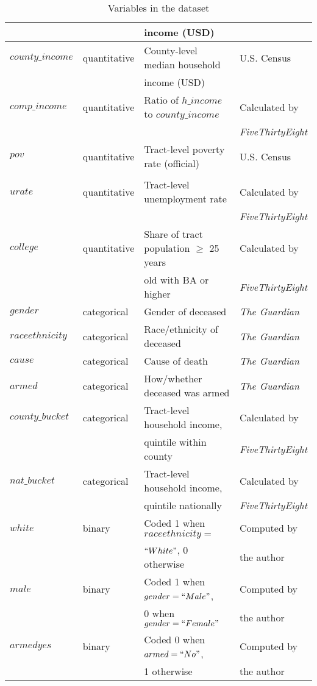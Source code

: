 \begin{table}[h]
\begin{tabular}{|l|l|l|l|}
        && income (USD) &\\
        \hline
        $county\_income$ & quantitative & County-level median household & U.S. Census\\
        && income (USD) &\\
        \hline
        $comp\_income$ & quantitative & Ratio of $h\_income$ to $county\_income$ & Calculated by\\
        &&& \textit{FiveThirtyEight}\\
        \hline
        $pov$ & quantitative & Tract-level poverty rate (official) & U.S. Census\\
        &&&\\
        \hline
        $urate$ & quantitative & Tract-level unemployment rate & Calculated by\\
        &&& \textit{FiveThirtyEight}\\
        \hline
        $college$ & quantitative & Share of tract population $\ge$ 25 years & Calculated by\\
        && old with BA or higher & \textit{FiveThirtyEight}\\
        \hline
        \hline
        $gender$ & categorical & Gender of deceased & \textit{The Guardian}\\
        \hline
        $raceethnicity$ & categorical & Race/ethnicity of deceased & \textit{The Guardian}\\
        \hline
        $cause$ & categorical & Cause of death & \textit{The Guardian}\\     \hline
        $armed$ & categorical & How/whether deceased was armed & \textit{The Guardian}\\
        \hline
        $county\_bucket$ & categorical & Tract-level household income, & Calculated by\\
        && quintile within county & \textit{FiveThirtyEight}\\
        \hline
        $nat\_bucket$ & categorical & Tract-level household income, & Calculated by\\
        && quintile nationally & \textit{FiveThirtyEight}\\
        \hline
        \hline
        $white$ & binary & Coded 1 when $raceethnicity =$ & Computed by\\
        && $``White"$, 0 otherwise & the author\\
        \hline
        $male$ & binary & Coded 1 when $gender = ``Male"$, & Computed by\\
        && 0 when $gender = ``Female"$ & the author\\
        \hline
        $armedyes$ & binary & Coded 0 when $armed = ``No"$, & Computed by\\
        && 1 otherwise & the author\\
        \hline
    \end{tabular}
    \caption{Variables in the dataset}
    \label{tab:variables}
\end{table}